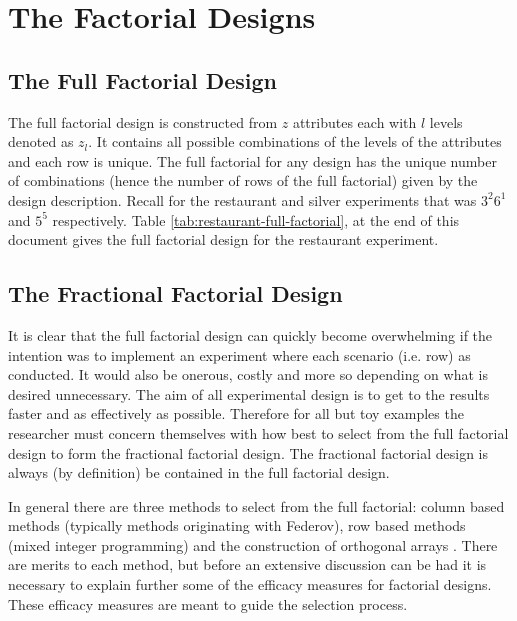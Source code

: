\documentclass{article}
\begin{document}
\section{The Factorial Designs}
\subsection{The Full Factorial Design}

The full factorial design is constructed from $z$ attributes each with $l$ levels denoted as $z_l$.
It contains all possible combinations of the levels of the attributes and each row is unique.
The full factorial for any design has the unique number of combinations (hence the number of rows of the full factorial) given by the design description.
Recall for the restaurant and silver experiments that was $3^2 6^1$ and $5^5$ respectively.
Table \ref{tab:restaurant-full-factorial}, at the end of this document gives the full factorial design for the restaurant experiment.

\subsection{The Fractional Factorial Design}
It is clear that the full factorial design can quickly become overwhelming if the intention was to implement an experiment where each scenario (i.e. row) as conducted.
It would also be onerous, costly and more so depending on what is desired unnecessary.
The aim of all experimental design is to get to the results faster and as effectively as possible.
Therefore for all but toy examples the researcher must concern themselves with how best to select from the full factorial design to form the fractional factorial design.
The fractional factorial design is always (by definition) be contained in the full factorial design.


In general there are three methods to select from the full factorial: column based methods (typically methods originating with Federov), row based methods (mixed integer programming) and the construction of orthogonal arrays \citep{gromping2018DoE, kuhfeld2010marketingresearch}.
There are merits to each method, but before an extensive discussion can be had it is necessary to explain further some of the efficacy measures for factorial designs.
These efficacy measures are meant to guide the selection process.
\end{document}
